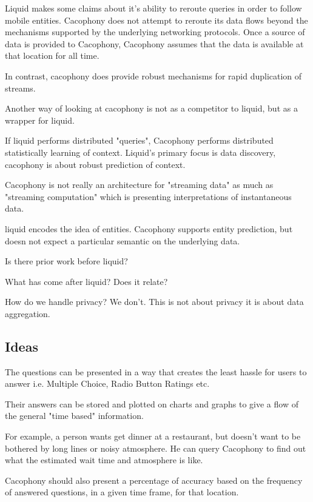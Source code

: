 Liquid makes some claims about it's ability to reroute queries in order to
follow mobile entities.  Cacophony does not attempt to reroute its data flows
beyond the mechanisms supported by the underlying networking protocols.  Once a
source of data is provided to Cacophony, Cacophony assumes that the data is
available at that location for all time.

In contrast, cacophony does provide robust mechanisms for rapid duplication of
streams.  

Another way of looking at cacophony is not as a competitor to liquid, but as a
wrapper for liquid. 

If liquid performs distributed "queries", Cacophony performs distributed
statistically learning of context.  Liquid's primary focus is data discovery,
cacophony is about robust prediction of context.

Cacophony is not really an architecture for "streaming data" as much as
"streaming computation" which is presenting interpretations of instantaneous
data.

liquid encodes the idea of entities.  Cacophony supports entity prediction, but
doesn not expect a particular semantic on the underlying data.



Is there prior work before liquid?

What has come after liquid?  Does it relate?
\cite{Hong2004}


How do we handle privacy? We don't.  This is not about privacy it is about data
aggregation.  



\subsection{Ideas}

The questions can be presented in a way that creates the least hassle for users
to answer i.e. Multiple Choice, Radio Button Ratings etc.

Their answers can be
stored and plotted on charts and graphs to give a flow of the general "time
based" information. 

For
example, a person wants get dinner at a restaurant, but doesn't want to be
bothered by long lines or noisy atmosphere. He can query Cacophony to find out
what the estimated wait time and atmosphere is like. 

Cacophony should also
present a percentage of accuracy based on the frequency of answered questions,
in a given time frame, for that location.

